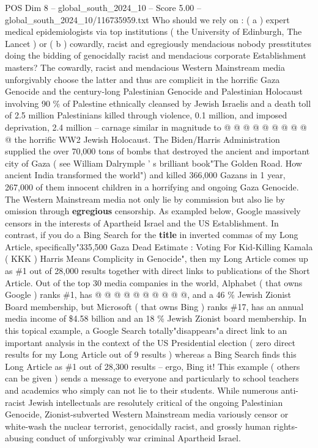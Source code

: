 \begin{textsample}{POS Dim 8 – global\_south\_2024\_10 – Score 5.00 – global\_south\_2024\_10/116735959.txt}
Who should we rely on : ( a ) expert medical epidemiologists via top institutions ( the University of Edinburgh, The Lancet ) or ( b ) cowardly, racist and egregiously mendacious nobody presstitutes doing the bidding of genocidally racist and mendacious corporate Establishment masters?
The cowardly, racist and mendacious Western Mainstream media unforgivably choose the latter and thus are complicit in the horrific Gaza Genocide and the century-long Palestinian Genocide and Palestinian Holocaust involving 90 \% of Palestine ethnically cleansed by Jewish Israelis and a death toll of 2.5 million Palestinians killed through violence, 0.1 million, and imposed deprivation, 2.4 million -- carnage similar in magnitude to @ @ @ @ @ @ @ @ @ @ the horrific WW2 Jewish Holocaust.
The Biden/Harris Administration supplied the over 70,000 tons of bombs that destroyed the ancient and important city of Gaza ( see William Dalrymple ' s brilliant book"The Golden Road.
How ancient India transformed the world") and killed 366,000 Gazans in 1 year, 267,000 of them innocent children in a horrifying and ongoing Gaza Genocide.
The Western Mainstream media not only lie by commission but also lie by omission through \textbf{egregious} censorship.
As exampled below, Google massively censors in the interests of Apartheid Israel and the US Establishment.
In contrast, if you do a Bing Search for the \textbf{title} in inverted commas of my Long Article, specifically"335,500 Gaza Dead Estimate : Voting For Kid-Killing Kamala ( KKK ) Harris Means Complicity in Genocide", then my Long Article comes up as \#1 out of 28,000 results together with direct links to publications of the Short Article.
Out of the top 30 media companies in the world, Alphabet ( that owns Google ) ranks \#1, has @ @ @ @ @ @ @ @ @ @, and a 46 \% Jewish Zionist Board membership, but Microsoft ( that owns Bing ) ranks \#17, has an annual media income of \$4.58 billion and an 18 \% Jewish Zionist board membership.
In this topical example, a Google Search totally"disappears"a direct link to an important analysis in the context of the US Presidential election ( zero direct results for my Long Article out of 9 results ) whereas a Bing Search finds this Long Article as \#1 out of 28,300 results -- ergo, Bing it!
This example ( others can be given ) sends a message to everyone and particularly to school teachers and academics who simply can not lie to their students.
While numerous anti-racist Jewish intellectuals are resolutely critical of the ongoing Palestinian Genocide, Zionist-subverted Western Mainstream media variously censor or white-wash the nuclear terrorist, genocidally racist, and grossly human rights-abusing conduct of unforgivably war criminal Apartheid Israel.

\end{textsample}

